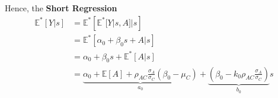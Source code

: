 \documentclass[11pt]{elegantbook}
\begin{document}
\begin{enumerate}
\begin{equation}
        \tag{AR-1}
        \label{AR-1}
    \end{equation}
    Hence, the \textbf{Short Regression}
    \begin{equation}
        \begin{aligned}
            \mathbb{E}^*[Y|s]&=\mathbb{E}^*\left[\mathbb{E}^*[Y|s,A]|s\right]\\
            &=\mathbb{E}^*\left[\alpha_0+\beta_0s+A|s\right]\\
            &=\alpha_0+\beta_0s+\mathbb{E}^*[A|s]\\
            &=\underbrace{\alpha_0+\mathbb{E}[A]+\rho_{AC}\frac{\sigma_A}{\sigma_C}(\beta_0-\mu_C)}_{a_0}+\underbrace{\left(\beta_0-k_0\rho_{AC}\frac{\sigma_A}{\sigma_C}\right)}_{b_0}s
        \end{aligned}
        \tag{SR}
        \label{SR}
    \end{equation}
\end{enumerate}
\end{document}
